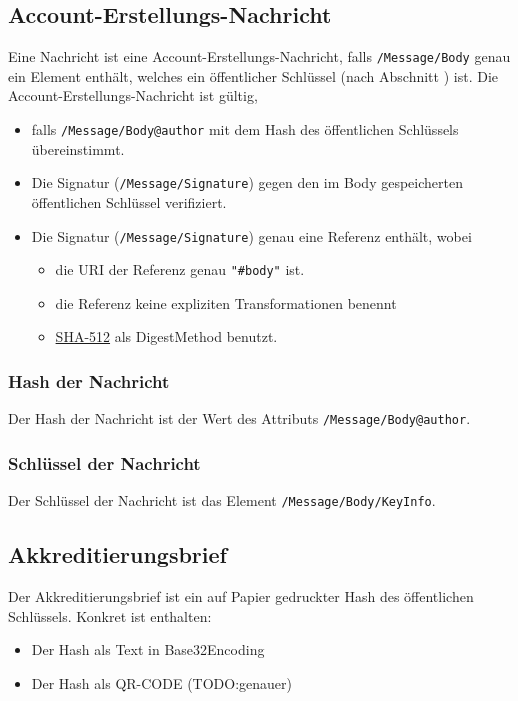 \documentclass[a4paper,10pt]{article}
\begin{document}
\subsection{Account-Erstellungs-Nachricht}
Eine Nachricht ist eine Account-Erstellungs-Nachricht, falls \texttt{/Message/Body} genau ein Element enthält, welches ein öffentlicher Schlüssel (nach Abschnitt \label{sec:publickKey}) ist. 
Die Account-Erstellungs-Nachricht ist gültig, 
\begin{itemize}
 \item falls \texttt{/Message/Body@author} mit dem Hash des öffentlichen Schlüssels übereinstimmt.
 \item Die Signatur (\texttt{/Message/Signature}) gegen den im Body gespeicherten öffentlichen Schlüssel verifiziert.
 \item Die Signatur (\texttt{/Message/Signature}) genau eine Referenz enthält, wobei
 \begin{itemize}
  \item die URI der Referenz genau \texttt{"\#body"} ist.
  \item die Referenz keine expliziten Transformationen benennt
  \item \href{http://www.w3.org/2001/04/xmlenc#sha512}{SHA-512} als DigestMethod benutzt.
 \end{itemize}
\end{itemize}

\subsubsection{Hash der Nachricht}
Der Hash der Nachricht ist der Wert des Attributs \texttt{/Message/Body@author}.

\subsubsection{Schlüssel der Nachricht}
Der Schlüssel der Nachricht ist das Element \texttt{/Message/Body/KeyInfo}.

\subsection{Akkreditierungsbrief}
Der Akkreditierungsbrief ist ein auf Papier gedruckter Hash des öffentlichen Schlüssels. Konkret ist enthalten:
\begin{itemize}
 \item Der Hash als Text in Base32Encoding
 \item Der Hash als QR-CODE (TODO:genauer)
\end{itemize}
\end{document}
